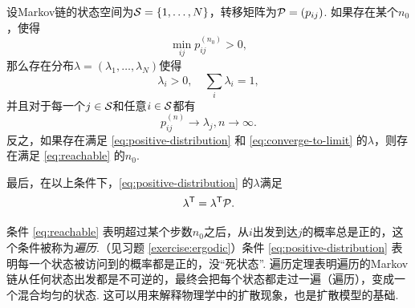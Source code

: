 \begin{theorem}[遍历定理]\label{thm:ergodic-theorem}
    设Markov链的状态空间为$\mathcal S=\{1,\dots,N\}$，转移矩阵为$\mathcal P=(p_{ij})$. 如果存在某个$n_0$，使得
    \begin{equation}
        \min_{ij}p_{ij}^{(n_0)}>0,\label{eq:reachable}
    \end{equation}
    那么存在分布$\lambda=(\lambda_1,\dots,\lambda_N)$使得
    \begin{equation}
        \lambda_i>0,\quad\sum_i\lambda_i=1,\label{eq:positive-distribution}
    \end{equation}
    并且对于每一个$j\in\mathcal S$和任意$i\in\mathcal S$都有
    \begin{equation}
    p_{ij}^{(n)}\to\lambda_j,n\to\infty.\label{eq:converge-to-limit}
    \end{equation}
    反之，如果存在满足 \eqref{eq:positive-distribution} 和 \eqref{eq:converge-to-limit} 的$\lambda$，则存在满足 \eqref{eq:reachable} 的$n_0$.

    最后，在以上条件下，\eqref{eq:positive-distribution} 的$\lambda$满足
    \begin{equation}
        \lambda^{\mathsf{T}} = \lambda^{\mathsf{T}}\mathcal P.\label{eq:stationary}
    \end{equation}
\end{theorem}

条件 \eqref{eq:reachable} 表明超过某个步数$n_0$之后，从$i$出发到达$j$的概率总是正的，这个条件被称为\emph{遍历}.（见习题 \ref{exercise:ergodic}）条件 \eqref{eq:positive-distribution} 表明每一个状态被访问到的概率都是正的，没“死状态”. 遍历定理表明遍历的Markov链从任何状态出发都是不可逆的，最终会把每个状态都走过一遍（遍历），变成一个混合均匀的状态. 这可以用来解释物理学中的扩散现象，也是扩散模型的基础.

